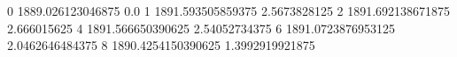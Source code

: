 0 1889.026123046875 0.0
1 1891.593505859375 2.5673828125
2 1891.692138671875 2.666015625
4 1891.566650390625 2.54052734375
6 1891.0723876953125 2.0462646484375
8 1890.4254150390625 1.3992919921875

